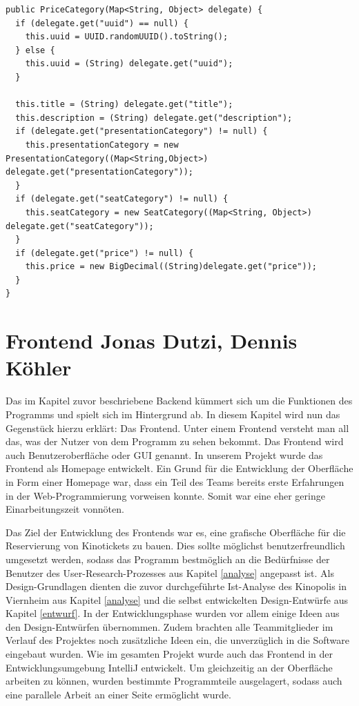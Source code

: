 \begin{lstlisting}[caption={Beispiel eines Delegate-Constructors}, label={lst:delegate_constructor}]
%%@JsonCreator%%
public PriceCategory(Map<String, Object> delegate) {
  if (delegate.get("uuid") == null) {
    this.uuid = UUID.randomUUID().toString();
  } else {
    this.uuid = (String) delegate.get("uuid");
  }

  this.title = (String) delegate.get("title");
  this.description = (String) delegate.get("description");
  if (delegate.get("presentationCategory") != null) {
    this.presentationCategory = new PresentationCategory((Map<String,Object>) delegate.get("presentationCategory"));
  }
  if (delegate.get("seatCategory") != null) {
    this.seatCategory = new SeatCategory((Map<String, Object>) delegate.get("seatCategory"));
  }
  if (delegate.get("price") != null) {
    this.price = new BigDecimal((String)delegate.get("price"));
  }
}
\end{lstlisting}
	
	\section[Frontend]{Frontend {\hfill \normalsize Jonas Dutzi, Dennis Köhler}}
	Das im Kapitel zuvor beschriebene Backend kümmert sich um die Funktionen des Programms und spielt sich im Hintergrund ab. In diesem Kapitel wird nun das Gegenstück hierzu erklärt: Das Frontend. Unter einem Frontend versteht man all das, was der Nutzer von dem Programm zu sehen bekommt. Das Frontend wird auch Benutzeroberfläche oder \ac{GUI} genannt. In unserem Projekt wurde das Frontend als Homepage entwickelt. Ein Grund für die Entwicklung der Oberfläche in Form einer Homepage war, dass ein Teil des Teams bereits erste Erfahrungen in der Web-Programmierung vorweisen konnte. Somit war eine eher geringe Einarbeitungszeit vonnöten.
	    
	    Das Ziel der Entwicklung des Frontends war es, eine grafische Oberfläche für die Reservierung von Kinotickets zu bauen. Dies sollte möglichst benutzerfreundlich umgesetzt werden, sodass das Programm bestmöglich an die Bedürfnisse der Benutzer des User-Research-Prozesses aus Kapitel \ref{analyse} angepasst ist. Als Design-Grundlagen dienten die zuvor durchgeführte Ist-Analyse des Kinopolis in Viernheim aus Kapitel \ref{analyse} und die selbst entwickelten Design-Entwürfe aus Kapitel \ref{entwurf}. In der Entwicklungsphase wurden vor allem einige Ideen aus den Design-Entwürfen übernommen. Zudem brachten alle Teammitglieder im Verlauf des Projektes noch zusätzliche Ideen ein, die unverzüglich in die Software eingebaut wurden. Wie im gesamten Projekt wurde auch das Frontend in der Entwicklungsumgebung IntelliJ entwickelt. Um gleichzeitig an der Oberfläche arbeiten zu können, wurden bestimmte Programmteile ausgelagert, sodass auch  eine parallele Arbeit an einer Seite ermöglicht wurde. 
	    
